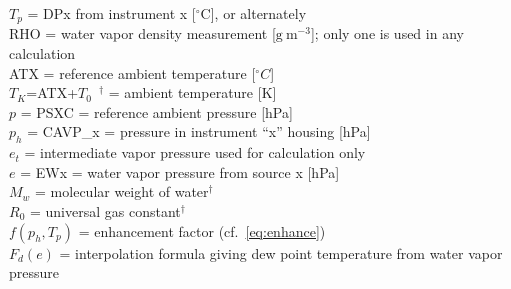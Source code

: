 \documentclass[
  english,
]{book}
\begin{document}
\(T_{p}\) = DPx from instrument x {[}\(^{\circ}\)C{]}, or alternately\\
RHO = water vapor density measurement
{[}\(\mathrm{g\ }\mathrm{m}^{-3}\){]}; only one is used in any calculation\\
ATX = reference ambient temperature {[}\(^{\circ}C\){]}\\
\(T_{K}\)=ATX+\(T_{0}\)~\(^{\dagger}\) = ambient temperature {[}K{]}\\
\(p\) = PSXC = reference ambient pressure {[}hPa{]}\\
\(p_{h}\) = CAVP\_x = pressure in instrument ``x'' housing {[}hPa{]}\\
\(e_{t}\) = intermediate vapor pressure used for calculation only\\
\(e\) = EWx = water vapor pressure from source x {[}hPa{]}\\
\(M_{w}\) = molecular weight of water\(^{\dagger}\)\\
\(R_{0}\) = universal gas constant\(^{\dagger}\)\\
\(f(p_{h},T_{p})\) = enhancement factor (cf.~\eqref{eq:enhance})\\
\(F_{d}(e)\) = interpolation formula giving dew point temperature from water vapor pressure
\end{document}
